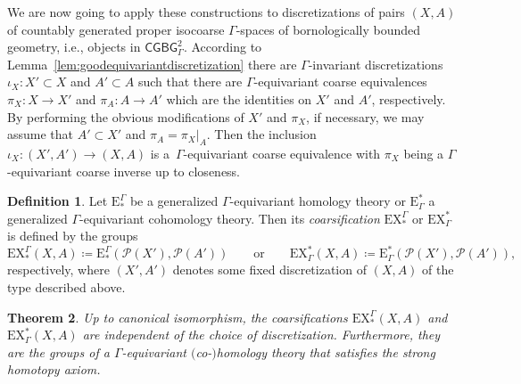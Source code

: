 \documentclass[pdftex]{sigma}
\numberwithin{equation}{section}
\newtheorem{thm}{Theorem}[section]
\theoremstyle{definition}
\newtheorem{defn}[thm]{Definition}
\newcommand{\cP}{\mathcal{P}}
\newcommand{\categoryfont}[1]{\mathsf{#1}}
\newcommand{\CGCBGz}[1][\Gamma]{\categoryfont{CGBG}^2_{#1}}
\newcommand{\Homol}{\mathrm{E}}
\newcommand{\Cohom}{\mathrm{E}}
\newcommand{\HomolX}{\mathrm{EX}}
\newcommand{\CohomX}{\mathrm{EX}}
\begin{document}
We are now going to apply these constructions to discretizations of pairs $(X,A)$ of countably generated proper isocoarse $\Gamma$-spaces of bornologically bounded geometry, i.e., objects in $\CGCBGz$. According to Lemma~\ref{lem:goodequivariantdiscretization} there are $\Gamma$-invariant discretizations $\iota_{X}\colon X'\subset X$ and $A'\subset A$ such that there are $\Gamma$-equivariant coarse equivalences $\pi_{X}\colon X\to X'$ and $\pi_{A}\colon A\to A'$ which are the identities on $X'$ and $A'$, respectively.
By performing the obvious modifications of $X'$ and $\pi_{X}$, if necessary, we may assume that $A'\subset X'$ and $\pi_{A}=\pi_{X}|_A$. Then the inclusion $\iota_{X}\colon (X',A')\to (X,A)$ is a~$\Gamma$-equivariant coarse equivalence with $\pi_{X}$ being a $\Gamma$-equivariant coarse inverse up to closeness.

\begin{defn}%
Let $\Homol_*^\Gamma$ be a generalized $\Gamma$-equivariant homology theory or $\Cohom^*_\Gamma$ a generalized $\Gamma$-equivariant cohomology theory. Then its \emph{coarsification} $\HomolX_*^\Gamma$ or $\CohomX^*_\Gamma$ is defined by the groups
\[
\HomolX_*^\Gamma(X,A)\coloneqq \Homol_*^\Gamma(\cP(X'),\cP(A'))\qquad\text{or}\qquad\CohomX^*_\Gamma(X,A)\coloneqq \Cohom^*_\Gamma(\cP(X'),\cP(A')),
\]
respectively, where $(X',A')$ denotes some fixed discretization of $(X,A)$ of the type described above.
\end{defn}

\begin{thm}\label{thm:coarsifiedtheories}
Up to canonical isomorphism, the coarsifications $\HomolX_*^\Gamma(X,A)$ and $\CohomX^*_\Gamma(X,A)$ are independent of the choice of discretization. Furthermore, they are the groups of a $\Gamma$-equivariant \mbox{$($co-$)$}homology theory that satisfies the strong homotopy axiom.
\end{thm}
\end{document}
